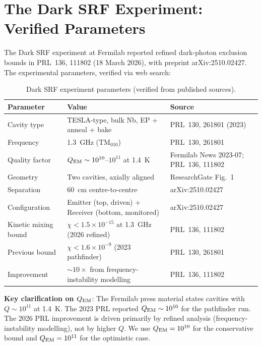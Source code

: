 \documentclass[11pt]{article}
\newcommand{\ee}[1]{\times 10^{#1}}
\newcommand{\QEM}{Q_{\rm EM}}
\theoremstyle{definition}
\theoremstyle{remark}
\begin{document}
\section{The Dark SRF Experiment: Verified Parameters}
\label{sec:dark_srf_params}

The Dark SRF experiment at Fermilab reported refined dark-photon
exclusion bounds in PRL~136, 111802 (18 March 2026), with preprint
arXiv:2510.02427. The experimental parameters, verified via web search:

\begin{table}[H]
\centering
\caption{Dark SRF experiment parameters (verified from published sources).}
\label{tab:dark_srf_params}
\renewcommand{\arraystretch}{1.3}
\begin{tabular}{@{}lll@{}}
\toprule
\textbf{Parameter} & \textbf{Value} & \textbf{Source} \\
\midrule
Cavity type & TESLA-type, bulk Nb, EP + anneal + bake &
  PRL~130, 261801 (2023) \\
Frequency & 1.3~GHz (TM$_{010}$) &
  PRL~130, 261801 \\
Quality factor & $\QEM \sim 10^{10}$--$10^{11}$ at 1.4~K &
  Fermilab News 2023-07; PRL~136, 111802 \\
Geometry & Two cavities, axially aligned &
  ResearchGate Fig.~1 \\
Separation & 60~cm centre-to-centre &
  arXiv:2510.02427 \\
Configuration & Emitter (top, driven) + Receiver (bottom, monitored) &
  arXiv:2510.02427 \\
Kinetic mixing bound & $\chi < 1.5\ee{-15}$ at 1.3~GHz (2026 refined) &
  PRL~136, 111802 \\
Previous bound & $\chi < 1.6\ee{-9}$ (2023 pathfinder) &
  PRL~130, 261801 \\
Improvement & $\sim 10\times$ from frequency-instability modelling &
  PRL~136, 111802 \\
\bottomrule
\end{tabular}
\end{table}

\textbf{Key clarification on $\QEM$}: The Fermilab press material states
cavities with $Q \sim 10^{11}$ at 1.4~K. The 2023 PRL reported
$\QEM \sim 10^{10}$ for the pathfinder run. The 2026 PRL improvement
is driven primarily by refined analysis (frequency-instability modelling),
not by higher $Q$. We use $\QEM = 10^{10}$ for the conservative bound
and $\QEM = 10^{11}$ for the optimistic case.
\end{document}
